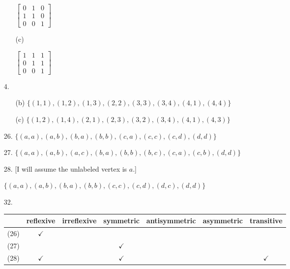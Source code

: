 \documentclass{article}
\begin{document}
\begin{enumerate}
\begin{itemize}
            \vspace{-0.1in}
                $\begin{bmatrix}
                0 & 1 & 0 \\
                1 & 1 & 0 \\
                0 & 0 & 1
                \end{bmatrix}$
            \item[(c)] \hfill

            \vspace{-0.1in}
                $\begin{bmatrix}
                1 & 1 & 1 \\
                0 & 1 & 1 \\
                0 & 0 & 1
                \end{bmatrix}$
        \end{itemize}
    \item[4.]
        \begin{itemize}
            \item[(b)] $\{ (1,1), (1,2), (1,3), (2,2), (3,3), (3,4), (4,1), (4,4) \}$
            \item[(c)] $\{ (1,2), (1,4), (2,1), (2,3), (3,2), (3,4), (4,1), (4,3) \}$
        \end{itemize}
    \item[26.] $\{ (a,a), (a,b), (b,a), (b,b), (c,a), (c,c), (c,d), (d,d) \}$
    \item[27.] $\{ (a,a), (a,b), (a,c), (b,a), (b,b), (b,c), (c,a), (c,b), (d,d) \}$
    \item[28.] [I will assume the unlabeled vertex is $a$.]

    $\{ (a,a), (a,b), (b,a), (b,b), (c,c), (c,d), (d,c), (d,d) \}$
    \item[32.]\hfill

    \vspace{-0.1in}
    \begin{tabular}{rcccccc}\hline
    & reflexive & irreflexive & symmetric & antisymmetric & asymmetric & transitive\\\hline
    (26) & $\checkmark$ &  &  &  &  &  \\
    (27) &  &  & $\checkmark$ &  &  &  \\
    (28) & $\checkmark$ &  & $\checkmark$ &  &  & $\checkmark$ \\\hline
    \end{tabular}
\end{enumerate}
\end{document}
